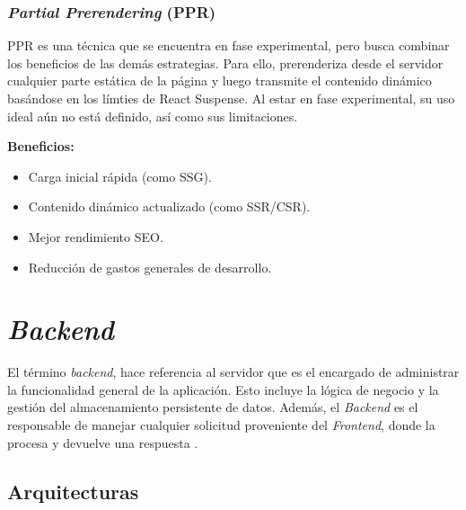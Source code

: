 \subsubsection{\textit{Partial Prerendering} (PPR)}
PPR es una técnica que se encuentra en fase experimental, pero busca combinar los beneficios de las demás estrategias. Para ello, 
prerenderiza desde el servidor cualquier parte estática de la página y luego transmite el contenido dinámico basándose en los
límties de React Suspense. Al estar en fase experimental, su uso ideal aún no está definido, así como sus limitaciones.

\textbf{Beneficios:}
\begin{itemize}
    \item Carga inicial rápida (como SSG).
    \item Contenido dinámico actualizado (como SSR/CSR).
    \item Mejor rendimiento SEO.
    \item Reducción de gastos generales de desarrollo.
\end{itemize}

\cite{vercel2024renderingStrategy}

\section{\textit{Backend}}
El término \textit{\gls{backend}}, hace referencia al servidor que es el encargado de administrar la funcionalidad general
de la aplicación. Esto incluye la lógica de negocio y la gestión del almacenamiento persistente de datos. Además, el
\textit{Backend} es el responsable de manejar cualquier solicitud proveniente del \textit{Frontend}, donde la procesa y
devuelve una respuesta \cite{aws2025frontendBackend}.

\subsection{Arquitecturas}

